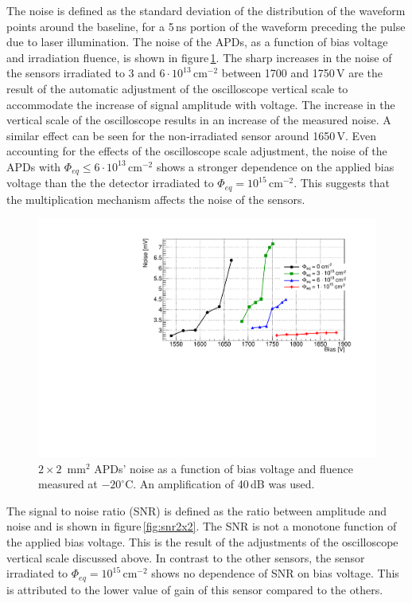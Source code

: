 \documentclass[review,number,sort&compress]{elsarticle}
\begin{document}
The noise is defined as the standard deviation of the distribution of the waveform points around the baseline, for a 5\,ns portion of the waveform preceding the pulse due to laser illumination.
The noise of the APDs, as a function of bias voltage and irradiation fluence, is shown in figure\,\ref{fig:noise2x2}.
The sharp increases in the noise of the sensors irradiated to $3$ and $6 \cdot 10^{13}$\,cm$^{-2}$ between 1700 and 1750\,V are the result of the automatic adjustment of the oscilloscope vertical scale to accommodate the increase of signal amplitude with voltage.
The increase in the vertical scale of the oscilloscope results in an increase of the measured noise.
A similar effect can be seen for the non-irradiated sensor around 1650\,V.
Even accounting for the effects of the oscilloscope scale adjustment, the noise of the APDs with $\Phi_{eq} \leq 6 \cdot 10^{13}$\,cm$^{-2}$ shows a stronger dependence on the applied bias voltage than the the detector irradiated to $\Phi_{eq} = 10^{15}$\,cm$^{-2}$.
This suggests that the multiplication mechanism affects the noise of the sensors.

\begin{figure}
  \centering
  \includegraphics[width = 0.6 \columnwidth]{noise2x2APDs}
  \caption{$2 \times 2$~mm$^2$ APDs' noise as a function of bias voltage and fluence measured at $-20^\circ$C. An amplification of 40\,dB was used.}
  \label{fig:noise2x2}
\end{figure}

The signal to noise ratio (SNR) is defined as the ratio between amplitude and noise and is shown in figure\,\ref{fig:snr2x2}.
The SNR is not a monotone function of the applied bias voltage.
This is the result of the adjustments of the oscilloscope vertical scale discussed above.
In contrast to the other sensors, the sensor irradiated to $\Phi_{eq} = 10^{15}$\,cm$^{-2}$ shows no dependence of SNR on bias voltage.
This is attributed to the lower value of gain of this sensor compared to the others.
\end{document}
